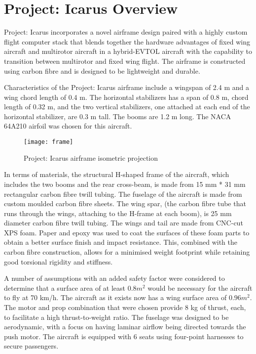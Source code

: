 \section{Project: Icarus Overview}
\label{sec:overview}

Project: Icarus incorporates a novel airframe design paired with a highly
custom flight computer stack that blends together the hardware advantages of
fixed wing aircraft and multirotor aircraft in a hybrid-EVTOL aircraft with the
capability to transition  between multirotor and fixed wing flight. The
airframe is constructed using carbon  fibre and is designed to be lightweight
and durable.

Characteristics of the Project: Icarus airframe include a wingspan of 2.4 m and
a wing chord length of 0.4 m. The horizontal stabilizers has a span of 0.8 m,
chord length of 0.32 m, and the two vertical stabilizers, one attached at each
end of the horizontal stabilizer, are 0.3 m tall. The booms are 1.2 m long. The
NACA 64A210  airfoil was chosen for this aircraft.

\begin{figure}[ht]
        \centering
        \texttt{[image: frame]}
        \caption{Project: Icarus airframe isometric projection}
\end{figure}

In terms of materials, the structural H-shaped frame of the aircraft, which
includes the two booms and the rear cross-beam, is made from 15 mm * 31 mm
rectangular carbon fibre twill tubing. The fuselage of the aircraft is made
from custom moulded carbon fibre sheets. The wing spar, (the carbon fibre tube
that runs through the wings, attaching to the H-frame at each boom), is 25 mm
diameter carbon fibre twill tubing. The wings and tail are made from CNC-cut
XPS foam. Paper and epoxy was used to coat the surfaces of these foam parts to
obtain a better surface finish and impact resistance. This, combined with the
carbon fibre construction, allows for a minimised weight footprint while
retaining good torsional rigidity and stiffness.

A number of assumptions with an added safety factor were considered to
determine that a surface area of at least $0.8 m^2$ would be necessary for the
aircraft to fly at 70 km/h. The aircraft as it exists now has a wing surface
area of $0.96 m^2$. The motor and prop combination that were chosen provide 8
kg of thrust, each, to facilitate a high thrust-to-weight ratio. The fuselage
was designed to be aerodynamic, with a focus on having laminar airflow being
directed towards the push motor. The aircraft is equipped with 6 seats using
four-point harnesses to secure passengers.

